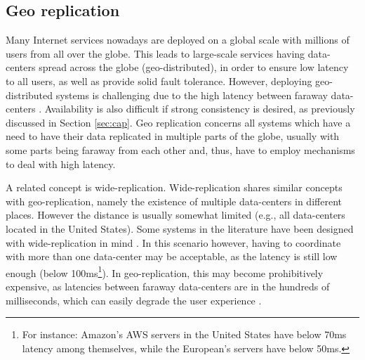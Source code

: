 

\subsection{Geo replication}
\label{subsec:geo}


Many Internet services nowadays are deployed on a global scale with millions of users from all over the globe.
This leads to large-scale services having data-centers spread across the globe (geo-distributed), in order to ensure low latency to all users, as well as provide solid fault tolerance.
However, deploying geo-distributed systems is challenging due to the high latency between faraway data-centers \cite{mdcc, eiger, chronocache, slog}. Availability is also difficult if strong consistency is desired, as previously discussed in Section \ref{sec:cap}.
Geo replication concerns all systems which have a need to have their data replicated in multiple parts of the globe, usually with some parts being faraway from each other and, thus, have to employ mechanisms to deal with high latency.

A related concept is wide-replication.
Wide-replication shares similar concepts with geo-replication, namely the existence of multiple data-centers in different places. 
However the distance is usually somewhat limited (e.g., all data-centers located in the United States).
Some systems in the literature have been designed with wide-replication in mind \cite{spanner, cops}.
In this scenario however, having to coordinate with more than one data-center may be acceptable, as the latency is still low enough \cite{spanner} (below 100ms\footnote{For instance: Amazon's AWS servers in the United States have below 70ms latency among themselves, while the European's servers have below 50ms.}).
In geo-replication, this may become prohibitively expensive, as latencies between faraway data-centers are in the hundreds of milliseconds, which can easily degrade the user experience \cite{mdcc, eiger, chronocache}.

